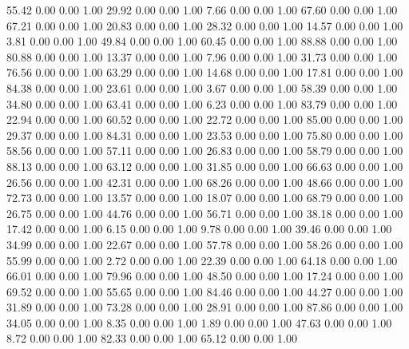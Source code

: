    55.42   0.00   0.00   1.00
   29.92   0.00   0.00   1.00
    7.66   0.00   0.00   1.00
   67.60   0.00   0.00   1.00
   67.21   0.00   0.00   1.00
   20.83   0.00   0.00   1.00
   28.32   0.00   0.00   1.00
   14.57   0.00   0.00   1.00
    3.81   0.00   0.00   1.00
   49.84   0.00   0.00   1.00
   60.45   0.00   0.00   1.00
   88.88   0.00   0.00   1.00
   80.88   0.00   0.00   1.00
   13.37   0.00   0.00   1.00
    7.96   0.00   0.00   1.00
   31.73   0.00   0.00   1.00
   76.56   0.00   0.00   1.00
   63.29   0.00   0.00   1.00
   14.68   0.00   0.00   1.00
   17.81   0.00   0.00   1.00
   84.38   0.00   0.00   1.00
   23.61   0.00   0.00   1.00
    3.67   0.00   0.00   1.00
   58.39   0.00   0.00   1.00
   34.80   0.00   0.00   1.00
   63.41   0.00   0.00   1.00
    6.23   0.00   0.00   1.00
   83.79   0.00   0.00   1.00
   22.94   0.00   0.00   1.00
   60.52   0.00   0.00   1.00
   22.72   0.00   0.00   1.00
   85.00   0.00   0.00   1.00
   29.37   0.00   0.00   1.00
   84.31   0.00   0.00   1.00
   23.53   0.00   0.00   1.00
   75.80   0.00   0.00   1.00
   58.56   0.00   0.00   1.00
   57.11   0.00   0.00   1.00
   26.83   0.00   0.00   1.00
   58.79   0.00   0.00   1.00
   88.13   0.00   0.00   1.00
   63.12   0.00   0.00   1.00
   31.85   0.00   0.00   1.00
   66.63   0.00   0.00   1.00
   26.56   0.00   0.00   1.00
   42.31   0.00   0.00   1.00
   68.26   0.00   0.00   1.00
   48.66   0.00   0.00   1.00
   72.73   0.00   0.00   1.00
   13.57   0.00   0.00   1.00
   18.07   0.00   0.00   1.00
   68.79   0.00   0.00   1.00
   26.75   0.00   0.00   1.00
   44.76   0.00   0.00   1.00
   56.71   0.00   0.00   1.00
   38.18   0.00   0.00   1.00
   17.42   0.00   0.00   1.00
    6.15   0.00   0.00   1.00
    9.78   0.00   0.00   1.00
   39.46   0.00   0.00   1.00
   34.99   0.00   0.00   1.00
   22.67   0.00   0.00   1.00
   57.78   0.00   0.00   1.00
   58.26   0.00   0.00   1.00
   55.99   0.00   0.00   1.00
    2.72   0.00   0.00   1.00
   22.39   0.00   0.00   1.00
   64.18   0.00   0.00   1.00
   66.01   0.00   0.00   1.00
   79.96   0.00   0.00   1.00
   48.50   0.00   0.00   1.00
   17.24   0.00   0.00   1.00
   69.52   0.00   0.00   1.00
   55.65   0.00   0.00   1.00
   84.46   0.00   0.00   1.00
   44.27   0.00   0.00   1.00
   31.89   0.00   0.00   1.00
   73.28   0.00   0.00   1.00
   28.91   0.00   0.00   1.00
   87.86   0.00   0.00   1.00
   34.05   0.00   0.00   1.00
    8.35   0.00   0.00   1.00
    1.89   0.00   0.00   1.00
   47.63   0.00   0.00   1.00
    8.72   0.00   0.00   1.00
   82.33   0.00   0.00   1.00
   65.12   0.00   0.00   1.00
